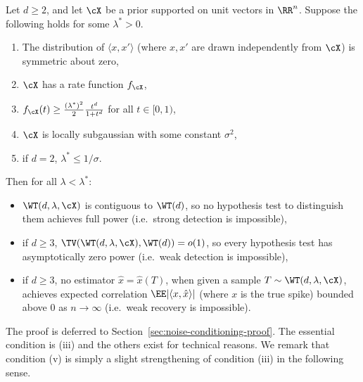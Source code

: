 \documentclass{article}
\begin{document}
\begin{theorem}\label{thm:noise-conditioning}
Let $d \geq 2$, and let $\cX$ be a prior supported on unit vectors in $\RR^n$. Suppose the following holds for some $\lambda^* > 0$.
\begin{enumerate}[label=(\roman*)]
    \item The distribution of $\langle x,x' \rangle$ (where $x,x'$ are drawn independently from $\cX$) is symmetric about zero,
    \item $\cX$ has a rate function $f_\cX$,
    \item $f_\cX(t) \ge \frac{(\lambda^*)^2}{2} \frac{t^d}{1+t^d}$ for all $t \in [0,1)$,
    \item $\cX$ is locally subgaussian with some constant $\sigma^2$,
    \item if $d=2$, $\lambda^* \leq 1/\sigma$.
\end{enumerate}
Then for all $\lambda < \lambda^*$:
\begin{itemize}
    \item $\WT(d,\lambda,\cX)$ is contiguous to $\WT(d)$, so no hypothesis test to distinguish them achieves full power (i.e.\ strong detection is impossible),
    \item if $d \ge 3$, $\TV(\WT(d,\lambda,\cX),\WT(d)) = o(1)$, so every hypothesis test has asymptotically zero power (i.e.\ weak detection is impossible),
    \item if $d \ge 3$, no estimator $\hat x = \hat x(T)$, when given a sample $T \sim \WT(d,\lambda,\cX)$, achieves expected correlation $\EE |\langle x,\hat x \rangle|$ (where $x$ is the true spike) bounded above $0$ as $n \to \infty$ (i.e.\ weak recovery is impossible).
\end{itemize}
\end{theorem}
\noindent The proof is deferred to Section~\ref{sec:noise-conditioning-proof}. The essential condition is (iii) and the others exist for technical reasons. We remark that condition (v) is simply a slight strengthening of condition (iii) in the following sense.
\end{document}

